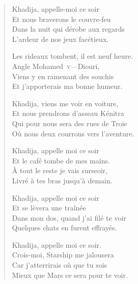 \begin{verse}%
  \quatrain%
  Khadija, appelle-moi ce soir\\  %
  Et nous braverons le couvre-feu\\  %
  Dans la nuit qui dérobe aux regards\\  %
  L’ardeur de nos jeux facétieux.

  Les rideaux tombent, il est neuf heure.\\  %
  Angle Mohamed~\textsc{v}—Diouri,\\  %
  Viens y en ramenant des souchis\\  %
  Et j’apporterais ma bonne humeur.

  Khadija, viens me voir en voiture,\\  %
  Et nous prendrons d’asseau Kénitra\\  %
  Qui pour nous sera des rues de Troie\\  %
  Où nous deux courrons vers l’aventure.

  Khadija, appelle moi ce soir\\  %
  Et le  café tombe de mes mains.\\  %
  À tout le reste je vais surseoir,\\  %
  Livré à tes bras jusqu’à demain.

  Khadija, appelle moi ce soir\\  %
  Et se lèvera une traînée\\  %
  Dans mon dos, quand j’ai filé te voir\\  %
  Quelques chats en furent effrayés.

  Khadija, appelle moi ce soir.\\  %
  Crois-moi, Starship me jalousera\\  %
  Car j’atterrirais où que tu sois\\  %
  Mieux que Mars ce sera pour te voir.
\end{verse}

